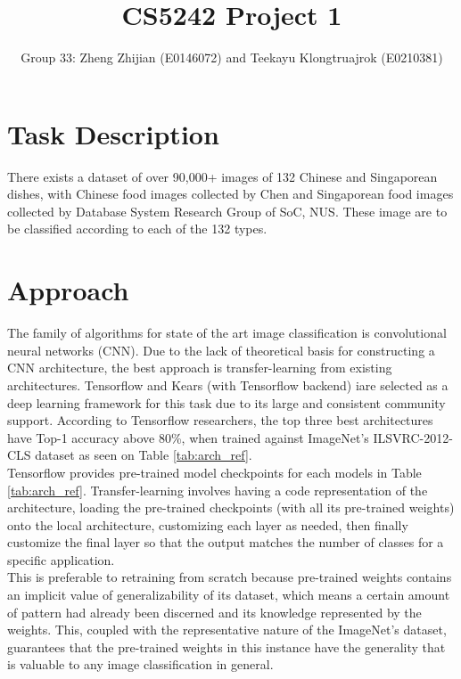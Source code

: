 \documentclass[a4paper]{article}
\title{CS5242 Project 1}
\author{Group 33: Zheng Zhijian (E0146072) and Teekayu Klongtruajrok (E0210381)}
\begin{document}
\maketitle

\section{Task Description}

There exists a dataset of over 90,000+ images of 132 Chinese and Singaporean dishes, with Chinese food images collected by Chen \cite{Chen2016} and Singaporean food images collected by Database System Research Group of SoC, NUS. These image are to be classified according to each of the 132 types. 

\section{Approach}

The family of algorithms for state of the art image classification is convolutional neural networks (CNN). Due to the lack of theoretical basis for constructing a CNN architecture, the best approach is transfer-learning from existing architectures. Tensorflow and Kears (with Tensorflow backend) iare selected as a deep learning framework for this task due to its large and consistent community support. According to Tensorflow researchers, the top three best architectures have Top-1 accuracy above 80\%, when trained against ImageNet's ILSVRC-2012-CLS dataset \cite{Silberman2017} as seen on Table \ref{tab:arch_ref}. \\

Tensorflow provides pre-trained model checkpoints for each models in Table \ref{tab:arch_ref}. Transfer-learning involves having a code representation of the architecture, loading the pre-trained checkpoints (with all its pre-trained weights) onto the local architecture, customizing each layer as needed, then finally customize the final layer so that the output matches the number of classes for a specific application. \\

This is preferable to retraining from scratch because pre-trained weights contains an implicit value of generalizability of its dataset, which means a certain amount of pattern had already been discerned and its knowledge represented by the weights. This, coupled with the representative nature of the ImageNet's dataset, guarantees that the pre-trained weights in this instance have the generality that is valuable to any image classification in general. \\
\end{document}
